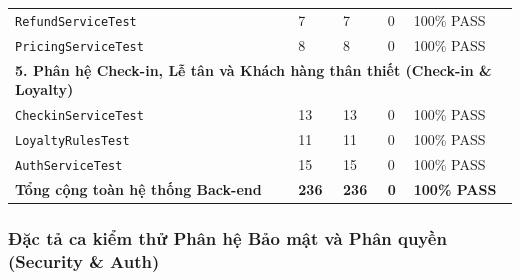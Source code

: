 \begin{table}[H]
\begin{tabular}{|p{5.5cm}|p{2.2cm}|p{2cm}|p{2cm}|p{2.5cm}|}
\texttt{RefundServiceTest} & 7 & 7 & 0 & 100\% PASS \\
\texttt{PricingServiceTest} & 8 & 8 & 0 & 100\% PASS \\
\hline
\multicolumn{5}{|l|}{\textbf{5. Phân hệ Check-in, Lễ tân và Khách hàng thân thiết (Check-in \& Loyalty)}} \\
\hline
\texttt{CheckinServiceTest} & 13 & 13 & 0 & 100\% PASS \\
\texttt{LoyaltyRulesTest} & 11 & 11 & 0 & 100\% PASS \\
\texttt{AuthServiceTest} & 15 & 15 & 0 & 100\% PASS \\
\hline
\textbf{Tổng cộng toàn hệ thống Back-end} & \textbf{236} & \textbf{236} & \textbf{0} & \textbf{100\% PASS} \\
\hline
\end{tabular}
\end{table}

\subsubsection{Đặc tả ca kiểm thử Phân hệ Bảo mật và Phân quyền (Security \& Auth)}

